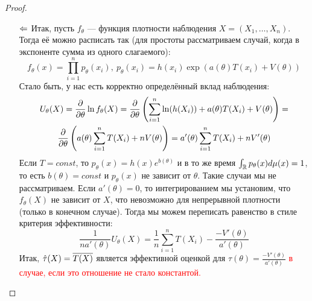 \begin{proof}~
	\begin{itemize}
		\item[$\Leftarrow$] Итак, пусть $f_\theta$ --- функция плотности наблюдения $X = (X_1, \ldots, X_n)$. Тогда её можно расписать так (для простоты рассматриваем случай, когда в экспоненте сумма из одного слагаемого):
		\[
			f_\theta(x) = \prod_{i = 1}^n p_\theta(x_i),\ p_\theta(x_i) = h(x_i)\exp(a(\theta)T(x_i) + V(\theta))
		\]
		Стало быть, у нас есть корректно определённый вклад наблюдения:
		\begin{multline*}
			U_\theta(X) = \frac{\partial }{\partial \theta} \ln f_\theta(X) = \frac{\partial }{\partial \theta} \left(\sum_{i = 1}^n \ln (h(X_i)) + a(\theta)T(X_i) + V(\theta)\right) =
			\\
			\frac{\partial }{\partial \theta} \left(a(\theta)\sum_{i = 1}^n T(X_i) + nV(\theta)\right) = a'(\theta)\sum_{i = 1}^n T(X_i) + nV'(\theta)
		\end{multline*}
		Если $T = const$, то $p_\theta(x) = h(x)e^{b(\theta)}$ и в то же время $\int_{\mathbb{R}} p_\theta(x)d\mu(x) = 1$, то есть $b(\theta) = const$ и $p_\theta(x)$ не зависит от $\theta$. Такие случаи мы не рассматриваем. Если $a'(\theta) = 0$, то интегрированием мы установим, что $f_\theta(X)$ не зависит от $X$, что невозможно для непрерывной плотности (только в конечном случае). Тогда мы можем переписать равенство в стиле критерия эффективности:
		\[
			\frac{1}{na'(\theta)}U_\theta(X) = \frac{1}{n}\sum_{i = 1}^n T(X_i) - \frac{-V'(\theta)}{a'(\theta)}
		\]
		Итак, $\hat{\tau}(X) = \overline{T(X)}$ является эффективной оценкой для $\tau(\theta) = \frac{-V'(\theta)}{a'(\theta)}$ \textcolor{red}{в случае, если это отношение не стало константой.}
		

\end{itemize}
\end{proof}
